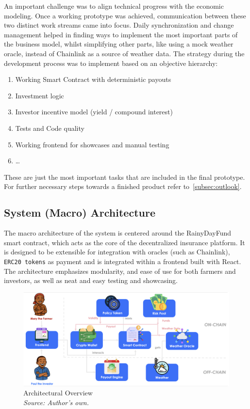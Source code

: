 \documentclass[11pt,a4paper]{article}
\begin{document}
	An important challenge was to align technical progress with the economic modeling.
	Once a working prototype was achieved, communication between these two distinct work streams came into focus.
	Daily synchronization and change management helped in finding ways to implement the most important parts of the business model, whilst simplifying other parts, like using a mock weather oracle, instead of Chainlink as a source of weather data.
	The strategy during the development process was to implement based on an objective hierarchy:

	\begin{enumerate}[1]
		\item Working Smart Contract with deterministic payouts
		\item Investment logic
		\item Investor incentive model (yield / compound interest)
		\item Tests and Code quality
		\item Working frontend for showcases and manual testing
		\item \ldots
	\end{enumerate}

	These are just the most important tasks that are included in the final prototype.
	For further necessary steps towards a finished product refer to~\ref{subsec:outlook}.


	\subsection{System (Macro) Architecture}\label{subsec:system-architecture}
	The macro architecture of the system is centered around the RainyDayFund smart contract, which acts as the core of the decentralized insurance platform.
	It is designed to be extensible for integration with oracles (such as Chainlink), \texttt{ERC20 tokens} as payment and is integrated within a frontend built with React.
	The architecture emphasizes modularity, and ease of use for both farmers and investors, as well as neat and easy testing and showcasing.

	\begin{figure}[H]
		\centering
		\includegraphics[scale=0.3]{graphics/Architectural_Overview}
		\caption{Architectural Overview \\ \textit{Source: Author's own.}}
		\label{fig:architecture}
	\end{figure}
\end{document}
